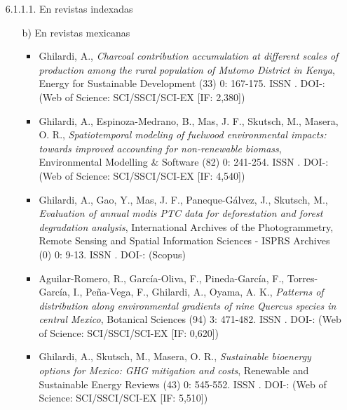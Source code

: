 \documentclass[12pt]{report}
\begin{document}
\begin{enumerate}
\begin{enumerate}
{\begin{enumerate}
\begin{enumerate}
                                                        \item[6.1.1.1.] En revistas indexadas
                                                                \begin{itemize}


                                                                            \item[b)] En revistas mexicanas
                                                                                \begin{itemize}

                                                                                        \item{  Ghilardi, A., \textit{ Charcoal contribution accumulation at different scales of production among the rural population of Mutomo District in Kenya}, Energy for Sustainable Development (33) 0: 167-175. ISSN . DOI-:  (Web of Science: SCI/SSCI/SCI-EX [IF: 2,380])}

                                                                                        \item{  Ghilardi, A., Espinoza-Medrano, B., Mas, J. F., Skutsch, M., Masera, O. R.,\textit{ Spatiotemporal modeling of fuelwood environmental impacts: towards improved accounting for non-renewable biomass}, Environmental Modelling & Software (82) 0: 241-254. ISSN . DOI-:  (Web of Science: SCI/SSCI/SCI-EX [IF: 4,540])}

                                                                                        \item{  Ghilardi, A., Gao, Y., Mas, J. F., Paneque-Gálvez, J., Skutsch, M.,\textit{ Evaluation of annual modis PTC data for deforestation and forest degradation analysis}, International Archives of the Photogrammetry, Remote Sensing and Spatial Information Sciences - ISPRS Archives (0) 0: 9-13. ISSN . DOI-:  (Scopus)}

                                                                                        \item{  Aguilar-Romero, R., García-Oliva, F., Pineda-García, F., Torres-García, I., Peña-Vega, F., Ghilardi, A., Oyama, A. K.,\textit{ Patterns of distribution along environmental gradients of nine Quercus species in central Mexico}, Botanical Sciences (94) 3: 471-482. ISSN . DOI-:  (Web of Science: SCI/SSCI/SCI-EX [IF: 0,620])}

                                                                                        \item{  Ghilardi, A., Skutsch, M., Masera, O. R.,\textit{ Sustainable bioenergy options for Mexico: GHG mitigation and costs}, Renewable and Sustainable Energy Reviews (43) 0: 545-552. ISSN . DOI-:  (Web of Science: SCI/SSCI/SCI-EX [IF: 5,510])}


\end{itemize}
\end{itemize}
\end{enumerate}
\end{enumerate}}
\end{enumerate}
\end{enumerate}
\end{document}
